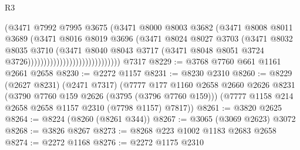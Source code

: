 \begin{lexlean}{R3}
\begin{coremodule}
                                              (@3471
                                                @7992
                                                @7995
                                                @3675
                                                (@3471
                                                  @8000
                                                  @8003
                                                  @3682
                                                  (@3471
                                                    @8008
                                                    @8011
                                                    @3689
                                                    (@3471
                                                      @8016
                                                      @8019
                                                      @3696
                                                      (@3471
                                                        @8024
                                                        @8027
                                                        @3703
                                                        (@3471
                                                          @8032
                                                          @8035
                                                          @3710
                                                          (@3471
                                                            @8040
                                                            @8043
                                                            @3717
                                                            (@3471
                                                              @8048
                                                              @8051
                                                              @3724
                                                              @3726)))))))))))))))))))))))))))))
    @7317
@8229 := @3768 @7760 @661 @1161 @2661 @2658
@8230 := @2272 @1157
@8231 := @8230 @2310
@8260 := @8229
    (@2627 @8231)
    (@2471 @7317)
    (@7777
      @177
      @1160
      @2658
      @2660
      @2626
      @8231
      (@3790 @7760 @159 @2626 (@3795 (@3796 @7760 @159)))
      (@7777 @1158 @214 @2658 @2658 @1157 @2310 (@7798 @1157) @7817))
@8261 := @3820 @2625
@8264 := @8224 (@8260 (@8261 @344))
@8267 := @3065 (@3069 @2623) @3072
@8268 := @3826 @8267
@8273 := @8268 @223 @1002 @1183 @2683 @2658
@8274 := @2272 @1168
@8276 := @2272 @1175 @2310

\end{coremodule}
\end{lexlean}
